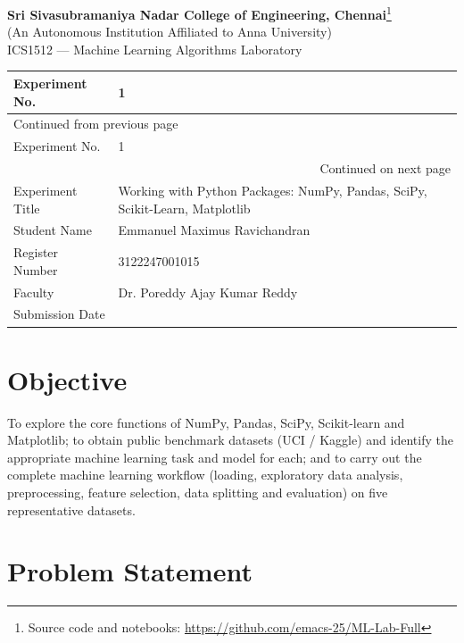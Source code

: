 \documentclass[11pt]{article}
\author{root}
\date{\today}
\title{}
\begin{document}
\begin{center}{\Large\bfseries Sri Sivasubramaniya Nadar College of Engineering, Chennai}\footnote{Source code and notebooks: \url{https://github.com/emacs-25/ML-Lab-Full}}\\[2pt]
(An Autonomous Institution Affiliated to Anna University)\\[2pt]
{\large ICS1512 --- Machine Learning Algorithms Laboratory}\end{center}

\begin{longtable}{|p{4cm}|p{11cm}|}
\hline
Experiment No. & 1\\[0pt]
\hline
\endfirsthead
\multicolumn{2}{l}{Continued from previous page} \\[0pt]
\hline

Experiment No. & 1 \\[0pt]

\hline
\endhead
\hline\multicolumn{2}{r}{Continued on next page} \\
\endfoot
\endlastfoot
\hline
Experiment Title & Working with Python Packages: NumPy, Pandas, SciPy, Scikit-Learn, Matplotlib\\[0pt]
\hline
Student Name & Emmanuel Maximus Ravichandran\\[0pt]
\hline
Register Number & 3122247001015\\[0pt]
\hline
Faculty & Dr. Poreddy Ajay Kumar Reddy\\[0pt]
\hline
Submission Date & \\[0pt]
\hline
\end{longtable}

\section*{Objective}
\label{sec:org3400dd7}


To explore the core functions of NumPy, Pandas, SciPy, Scikit-learn and Matplotlib; to
obtain public benchmark datasets (UCI / Kaggle) and identify the appropriate machine
learning task and model for each; and to carry out the complete machine learning workflow
(loading, exploratory data analysis, preprocessing, feature selection, data splitting and
evaluation) on five representative datasets.

\section*{Problem Statement}
\label{sec:org7929269}
\end{document}
